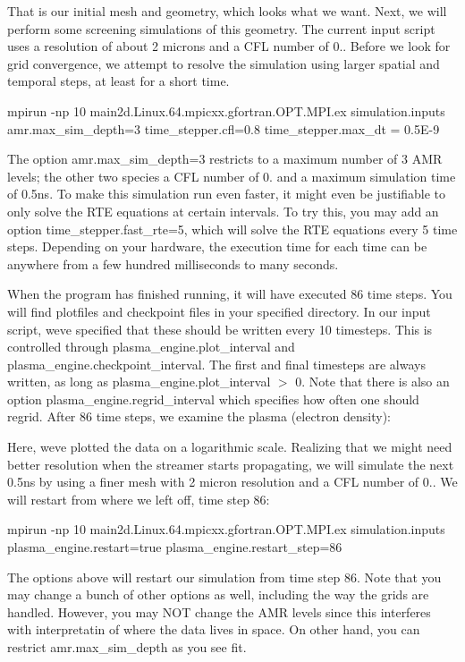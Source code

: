 That is our initial mesh and geometry, which looks what we want. Next, we will perform some screening simulations of this geometry. The current input script uses a resolution of about 2 microns and a C\+FL number of 0.. Before we look for grid convergence, we attempt to resolve the simulation using larger spatial and temporal steps, at least for a short time.

\begin{DoxyVerb}  mpirun -np 10 main2d.Linux.64.mpicxx.gfortran.OPT.MPI.ex simulation.inputs amr.max_sim_depth=3 time_stepper.cfl=0.8 time_stepper.max_dt = 0.5E-9
\end{DoxyVerb}


The option amr.\+max\+\_\+sim\+\_\+depth=3 restricts to a maximum number of 3 A\+MR levels; the other two species a C\+FL number of 0. and a maximum simulation time of 0.\+5ns. To make this simulation run even faster, it might even be justifiable to only solve the R\+TE equations at certain intervals. To try this, you may add an option time\+\_\+stepper.\+fast\+\_\+rte=5, which will solve the R\+TE equations every 5 time steps. Depending on your hardware, the execution time for each time can be anywhere from a few hundred milliseconds to many seconds.

When the program has finished running, it will have executed 86 time steps. You will find plotfiles and checkpoint files in your specified directory. In our input script, we\textquotesingle{}ve specified that these should be written every 10 timesteps. This is controlled through plasma\+\_\+engine.\+plot\+\_\+interval and plasma\+\_\+engine.\+checkpoint\+\_\+interval. The first and final timesteps are always written, as long as plasma\+\_\+engine.\+plot\+\_\+interval $>$ 0. Note that there is also an option plasma\+\_\+engine.\+regrid\+\_\+interval which specifies how often one should regrid. After 86 time steps, we examine the plasma (electron density)\+:



Here, we\textquotesingle{}ve plotted the data on a logarithmic scale. Realizing that we might need better resolution when the streamer starts propagating, we will simulate the next 0.\+5ns by using a finer mesh with 2 micron resolution and a C\+FL number of 0.. We will restart from where we left off, time step 86\+: \begin{DoxyVerb}  mpirun -np 10 main2d.Linux.64.mpicxx.gfortran.OPT.MPI.ex simulation.inputs plasma_engine.restart=true plasma_engine.restart_step=86
\end{DoxyVerb}


The options above will restart our simulation from time step 86. Note that you may change a bunch of other options as well, including the way the grids are handled. However, you may N\+OT change the A\+MR levels since this interferes with interpretatin of where the data lives in space. On other hand, you can restrict amr.\+max\+\_\+sim\+\_\+depth as you see fit. 